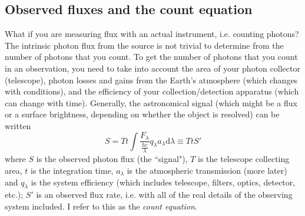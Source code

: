\documentclass[12pt]{article}
\begin{document}
\subsection*{Observed fluxes and the count equation}
What if you are measuring flux with an actual instrument, i.e.
counting photons? The intrinsic photon flux from the source is not
trivial to determine from the number of photons that you count. To get
the number of photons that you count in an observation, you need to
take into account the area of your photon collector (telescope),
photon losses and gains from the Earth's atmosphere (which changes
with conditions), and the efficiency of your collection/detection
apparatus (which can change with time). Generally, the astronomical
signal (which might be a flux or a surface brightness, depending on
whether the object is resolved) can be written
\begin{equation*}
    S = Tt \int \frac{F_{\lambda}}{\frac{hc}{\lambda}}q_{\lambda}
    a_{\lambda}\textrm{d}\lambda \equiv TtS'
\end{equation*}
where $S$ is the observed photon flux (the ``signal"), $T$ is the
telescope collecting area, $t$ is the integration time, $a_{\lambda}$
is the atmospheric transmission (more later) and
$q_{\lambda}$ is the system efficiency (which includes
telescope, filters, optics, detector, etc.); $S'$ is an observed flux
rate, i.e. with all of the real details of the observing system
included. I refer to this as the \emph{count equation}.\\
\end{document}
